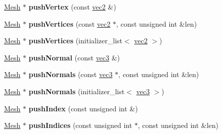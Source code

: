 \begin{DoxyCompactItemize}
\item 
\hypertarget{classj3d_1_1Mesh_add174405f0afe0442c65867d5e23f417}{}\hyperlink{classj3d_1_1Mesh}{Mesh} $\ast$ {\bfseries push\+Vertex} (const \hyperlink{structj3d_1_1vec2}{vec2} \&)\label{classj3d_1_1Mesh_add174405f0afe0442c65867d5e23f417}

\item 
\hypertarget{classj3d_1_1Mesh_a0a2c34d440ea1fa82320798d5f43d9a8}{}\hyperlink{classj3d_1_1Mesh}{Mesh} $\ast$ {\bfseries push\+Vertices} (const \hyperlink{structj3d_1_1vec2}{vec2} $\ast$, const unsigned int \&len)\label{classj3d_1_1Mesh_a0a2c34d440ea1fa82320798d5f43d9a8}

\item 
\hypertarget{classj3d_1_1Mesh_ab3202bad7bf7e180eacbb0c3410607bf}{}\hyperlink{classj3d_1_1Mesh}{Mesh} $\ast$ {\bfseries push\+Vertices} (initializer\+\_\+list$<$ \hyperlink{structj3d_1_1vec2}{vec2} $>$)\label{classj3d_1_1Mesh_ab3202bad7bf7e180eacbb0c3410607bf}

\item 
\hypertarget{classj3d_1_1Mesh_ad60a48983a6787008d2b380a1db2a729}{}\hyperlink{classj3d_1_1Mesh}{Mesh} $\ast$ {\bfseries push\+Normal} (const \hyperlink{structj3d_1_1vec3}{vec3} \&)\label{classj3d_1_1Mesh_ad60a48983a6787008d2b380a1db2a729}

\item 
\hypertarget{classj3d_1_1Mesh_a98003392f9f323c7416cf1654a660956}{}\hyperlink{classj3d_1_1Mesh}{Mesh} $\ast$ {\bfseries push\+Normals} (const \hyperlink{structj3d_1_1vec3}{vec3} $\ast$, const unsigned int \&len)\label{classj3d_1_1Mesh_a98003392f9f323c7416cf1654a660956}

\item 
\hypertarget{classj3d_1_1Mesh_a9369a90e560398ff05fd30cb6c1897c8}{}\hyperlink{classj3d_1_1Mesh}{Mesh} $\ast$ {\bfseries push\+Normals} (initializer\+\_\+list$<$ \hyperlink{structj3d_1_1vec3}{vec3} $>$)\label{classj3d_1_1Mesh_a9369a90e560398ff05fd30cb6c1897c8}

\item 
\hypertarget{classj3d_1_1Mesh_a38376550db6060e51b88ed54b327d44e}{}\hyperlink{classj3d_1_1Mesh}{Mesh} $\ast$ {\bfseries push\+Index} (const unsigned int \&)\label{classj3d_1_1Mesh_a38376550db6060e51b88ed54b327d44e}

\item 
\hypertarget{classj3d_1_1Mesh_a111eca316406e214f9f3a11836879453}{}\hyperlink{classj3d_1_1Mesh}{Mesh} $\ast$ {\bfseries push\+Indices} (const unsigned int $\ast$, const unsigned int \&len)\label{classj3d_1_1Mesh_a111eca316406e214f9f3a11836879453}


\end{DoxyCompactItemize}

